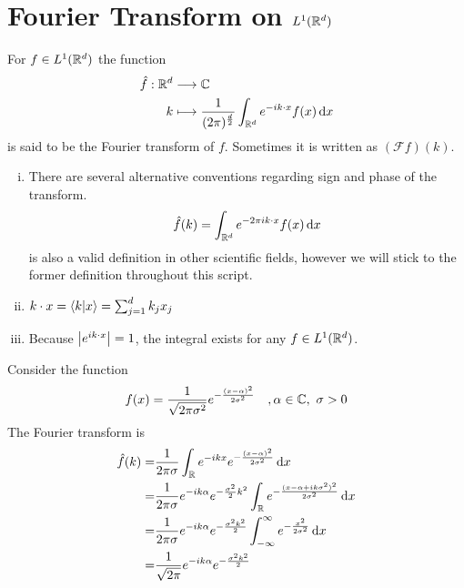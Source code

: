 \documentclass[../../script.tex]{subfiles}
\begin{document}
\section{Fourier Transform on $L^1(\mathbb{R}^d)$}

\begin{defi}
    For $f \in L^1(\mathbb{R}^d)$ the function
    \begin{align*}
        \hat{f}: \mathbb{R}^d &\longrightarrow \mathbb{C} \\
        k &\longmapsto \frac{1}{(2\pi)^{\frac{d}{2}}} \int_{\mathbb{R}^d} e^{-ik \cdot x} f(x) \dd{x}
    \end{align*}
    is said to be the Fourier transform of $f$. Sometimes it is written as $(\mathcal{F}f)(k)$.
\end{defi}

\begin{rem}
    \begin{enumerate}[(i)]
        \item There are several alternative conventions regarding sign and phase of the transform. 
        \[
            \hat{f}(k) = \int_{\mathbb{R}^d} e^{-2\pi ik \cdot x} f(x) \dd{x}
        \]
        is also a valid definition in other scientific fields, however we will stick to the former definition throughout this script.

        \item $k \cdot x = \innerproduct{k}{x} = \sum_{j=1}^d k_j x_j$
        \item Because $\abs{e^{ik \cdot x}} = 1$, the integral exists for any $f \in L^1(\mathbb{R}^d)$.
    \end{enumerate}
\end{rem}

\begin{eg}\label{eg:1}
    Consider the function 
    \[
        f(x) = \frac{1}{\sqrt{2\pi\sigma^2}} e^{-\frac{(x - \alpha)^2}{2\sigma^2}} \quad ,\alpha \in \mathbb{C}, ~\sigma > 0
    \]
    The Fourier transform is
    \begin{align*}
        \hat{f}(k) = &\frac{1}{2\pi\sigma} \int_{\mathbb{R}} e^{-ikx} e^{-\frac{(x - \alpha)^2}{2\sigma^2}} \dd{x} \\
        = &\frac{1}{2\pi\sigma} e^{-ik\alpha} e^{-\frac{\sigma^2}{2} k^2} \int_{\mathbb{R}} e^{-\frac{(x - \alpha + ik\sigma^2)^2}{2\sigma^2}} \dd{x} \\
        = &\frac{1}{2\pi\sigma} e^{-ik\alpha} e^{-\frac{\sigma^2 k^2}{2}} \int_{-\infty}^{\infty} e^{-\frac{x^2}{2\sigma^2}} \dd{x} \\
        = &\frac{1}{\sqrt{2\pi}} e^{-ik\alpha} e^{-\frac{\sigma^2 k^2}{2}}
    \end{align*}
\end{eg}
\end{document}
